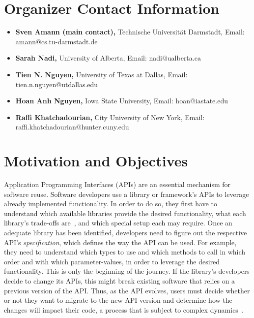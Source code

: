 \documentclass[10pt, conference]{IEEEtran}
\newcommand{\updated}[1]{#1}
\begin{document}
\section{Organizer Contact Information}
\begin{itemize}
\setlength\itemsep{5pt}
\item \textbf{Sven Amann (main contact),} Technische Universit\"{a}t Darmstadt, Email: amann@cs.tu-darmstadt.de
\item \textbf{Sarah Nadi,} University of Alberta, Email: nadi@ualberta.ca
\item \textbf{Tien N. Nguyen,} University of Texas at Dallas, Email: tien.n.nguyen@utdallas.edu
\item \textbf{Hoan Anh Nguyen,} Iowa State University, Email: hoan@iastate.edu
\item \textbf{Raffi Khatchadourian,} City University of New York, Email: raffi.khatchadourian@hunter.cuny.edu
\end{itemize}

\section{Motivation and Objectives}
Application Programming Interfaces (APIs) are an essential mechanism for software reuse. Software developers use a library or framework's APIs to leverage already implemented functionality. In order to do so, they first have to understand which available libraries provide the desired functionality, what each library's trade-offs are\updated{~\cite{ZHHK17}}, and which special setup each may require. Once an adequate library has been identified, developers need to figure out the respective API's \textit{specification}, which defines the way the API can be used. For example, they need to understand which types to use and which methods to call in which order and with which parameter-values, in order to leverage the desired functionality. This is only the beginning of the journey. If the library's developers decide to change its APIs, this might break existing software that relies on a previous version of the API\@. Thus, as the API evolves, users must decide whether or not they want to migrate to the new API version and determine how the changes will impact their code\updated{, a process that is subject to complex dynamics~\cite{JKR+17}}.
\end{document}
